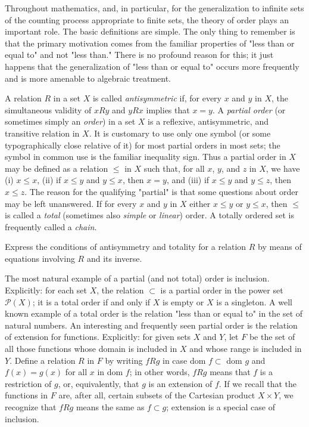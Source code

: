 
Throughout mathematics, and, in particular, for the generalization to infinite sets of the counting process appropriate to finite sets, the theory of order plays an important role. The basic definitions are simple. The only thing to remember is that the primary motivation comes from the familiar properties of "less than or equal to" and not "less than." There is no profound reason for this; it just happens that the generalization of "less than or equal to" occurs more frequently and is more amenable to algebraic treatment. 

A relation $R$ in a set $X$ is called \textit{antisymmetric} if, for every $x$ and $y$ in $X$, the simultaneous validity of $xRy$ and $yRx$ implies that $x = y$. A \textit{partial order} (or sometimes simply an \textit{order}) in a set $X$ is a reflexive, antisymmetric, and transitive relation in $X$. It is customary to use only one symbol (or some typographically close relative of it) for most partial orders in most sets; the symbol in common use is the familiar inequality sign. Thus a partial order in $X$ may be defined as a relation $\le$ in $X$ such that, for all $x$, $y$, and $z$ in $X$, we have (i) $x \le x$, (ii) if $x \le y$ and $y \le x$, then $x = y$, and (iii) if $x \le y$ and $y \le z$, then $x \le z$. The reason for the qualifying "partial" is that some questions about order may be left unanswered. If for every $x$ and $y$ in $X$ either $x \le y$ or $y \le x$, then $\le$ is called a \textit{total} (sometimes also \textit{simple} or \textit{linear}) order. A totally ordered set is frequently called a \textit{chain}. 

\begin{exercise} Express the conditions of antisymmetry and totality for a relation $R$ by means of equations involving $R$ and its inverse. 
\end{exercise}

The most natural example of a partial (and not total) order is inclusion. Explicitly: for each set $X$, the relation $\subset$ is a partial order in the power set $\mathcal{P}(X)$; it is a total order if and only if $X$ is empty or $X$ is a singleton. A well known example of a total order is the relation "less than or equal to" in the set of natural numbers. An interesting and frequently seen partial order is the relation of extension for functions. Explicitly: for given sets $X$ and $Y$, let $F$ be the set of all those functions whose domain is included in $X$ and whose range is included in $Y$. Define a relation $R$ in $F$ by writing $fRg$ in case dom $f \subset$ dom $g$ and $f(x) = g(x)$ for all $x$ in dom $f$; in other words, $fRg$ means that $f$ is a restriction of $g$, or, equivalently, that $g$ is an extension of $f$. If we recall that the functions in $F$ are, after all, certain subsets of the Cartesian product $X \times Y$, we recognize that $fRg$ means the same as $f \subset g$; extension is a special case of inclusion.

